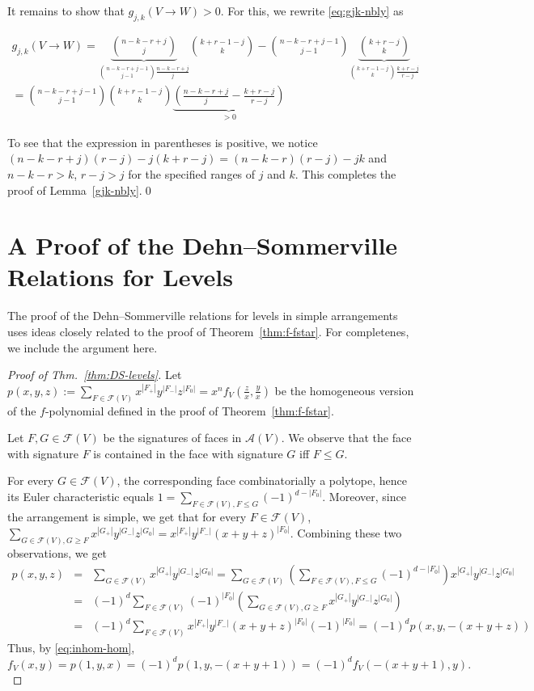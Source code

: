 \documentclass[a4paper,USenglish,cleveref, autoref, thm-restate,nolineno]{socg-lipics-v2021}
\newcommand{\arr}{\mathcal{A}}
\newcommand{\fhom}{p}
\renewcommand{\leq}{\leqslant}
\renewcommand{\geq}{\geqslant}
\begin{document}
It remains to show that $g_{j,k}(V \to W) > 0$. For this, we rewrite \eqref{eq:gjk-nbly} as

\begin{multline}
g_{j,k}(V \to W)=\underbrace{\binom{n-k-r+j}{j}}_{\binom{n-k-r+j-1}{j-1} \frac{n-k-r+j}{j}}\binom{k+r-1-j}{k} - \binom{n-k-r+j-1}{j-1} \underbrace{\binom{k+r-j}{k}}_{\binom{k+r-1-j}{k} \frac{k+r-j}{r-j}}  \\
= \binom{n-k-r+j-1}{j-1} \binom{k+r-1-j}{k} \underbrace{ \left( \frac{n-k-r+j}{j} - \frac{k+r-j}{r-j} \right)}_{>0}
\end{multline}

To see that the expression in parentheses is positive, we notice $(n-k-r+j)(r-j) - j (k+r-j) = (n-k-r)(r-j)-jk$ and $n-k-r > k$, $r-j > j$ for the specified ranges of $j$ and $k$.
This completes the proof of Lemma~\ref{gjk-nbly}.\qed

\section{A Proof of the Dehn--Sommerville Relations for Levels}
\label{app_proof-DS}
The proof of the Dehn--Sommerville relations for levels in simple arrangements uses ideas closely related to the proof of Theorem~\ref{thm:f-fstar}. For completenes, we include the argument here.

\begin{proof}[Proof of Thm.~\ref{thm:DS-levels}]
Let $\fhom(x,y,z):=\sum_{F\in \mathcal{F}(V)} x^{|F_+|}y^{|F_-|}z^{|F_0|}=x^n f_V(\frac{z}{x},\frac{y}{x})$ be the homogeneous version of the $f$-polynomial defined in the proof of Theorem~\ref{thm:f-fstar}. 

Let $F,G \in \mathcal{F}(V)$ be the signatures of faces in $\arr(V)$. We observe that the face with signature $F$ is contained in the face with signature $G$ iff $F\leq G$.

For every $G \in \mathcal{F}(V)$, the corresponding face combinatorially a polytope, hence its Euler characteristic equals 
$1=\sum_{F\in \mathcal{F}(V), F\leq G} (-1)^{d-|F_0|}$.
Moreover, since the arrangement is simple, we get that for every $F\in \mathcal{F}(V)$,
$
\sum_{G\in \mathcal{F}(V), G\geq F} x^{|G_+|} y^{|G_-|} z^{|G_0|}=x^{|F_+|} y^{|F_-|}(x+y+z)^{|F_0|}
$.
Combining these two observations, we get
\begin{eqnarray*}
\fhom(x,y,z) & = & \sum_{G\in \mathcal{F}(V)}x^{|G_+|} y^{|G_-|} z^{|G_0|} = \sum_{G\in \mathcal{F}(V)}\left(\sum_{F\in \mathcal{F}(V), F\leq G} (-1)^{d-|F_0|}\right)x^{|G_+|} y^{|G_-|}z^{|G_0|}\\
& = & (-1)^d \sum_{F\in \mathcal{F}(V)} (-1)^{|F_0|} \left( \sum_{G\in \mathcal{F}(V), G\geq F} x^{|G_+|} y^{|G_-|}z^{|G_0|}
\right)\\
& = & (-1)^d \sum_{F\in \mathcal{F}(V)} x^{|F_+|} y^{|F_-|}(x+y+z)^{|F_0|}(-1)^{|F_0|} = (-1)^d p(x,y,-(x+y+z))
\end{eqnarray*}
Thus, by \eqref{eq:inhom-hom}, 
$
f_V(x,y)=p(1,y,x)=(-1)^d p(1,y,-(x+y+1))=(-1)^d f_V(-(x+y+1),y).
$
\end{proof}
\end{document}
